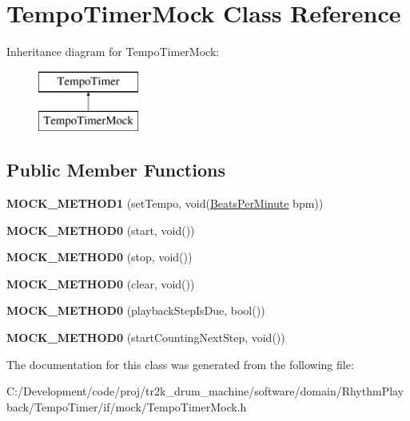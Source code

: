 \hypertarget{class_tempo_timer_mock}{}\section{Tempo\+Timer\+Mock Class Reference}
\label{class_tempo_timer_mock}
Inheritance diagram for Tempo\+Timer\+Mock\+:\begin{figure}[H]
\begin{center}
\leavevmode
\includegraphics[height=2.000000cm]{class_tempo_timer_mock}
\end{center}
\end{figure}
\subsection*{Public Member Functions}
\begin{DoxyCompactItemize}
\item 
\mbox{\label{class_tempo_timer_mock_a744b62ff6f202c876325f757f9ccc836}} 
{\bfseries M\+O\+C\+K\+\_\+\+M\+E\+T\+H\+O\+D1} (set\+Tempo, void(\mbox{\hyperlink{class_beats_per_minute}{Beats\+Per\+Minute}} bpm))
\item 
\mbox{\label{class_tempo_timer_mock_a77a9c50cf356c36511139c8270625793}} 
{\bfseries M\+O\+C\+K\+\_\+\+M\+E\+T\+H\+O\+D0} (start, void())
\item 
\mbox{\label{class_tempo_timer_mock_a79ac2d1e81fe29d3301b8c38c93879d1}} 
{\bfseries M\+O\+C\+K\+\_\+\+M\+E\+T\+H\+O\+D0} (stop, void())
\item 
\mbox{\label{class_tempo_timer_mock_a2a9634cefd6bafe16cd7f09621a57fe9}} 
{\bfseries M\+O\+C\+K\+\_\+\+M\+E\+T\+H\+O\+D0} (clear, void())
\item 
\mbox{\label{class_tempo_timer_mock_ac38619037ba0cdc4659286cb512ff08a}} 
{\bfseries M\+O\+C\+K\+\_\+\+M\+E\+T\+H\+O\+D0} (playback\+Step\+Is\+Due, bool())
\item 
\mbox{\label{class_tempo_timer_mock_a2db4e5a24a1e9e2c253d9efcc8a3f6c5}} 
{\bfseries M\+O\+C\+K\+\_\+\+M\+E\+T\+H\+O\+D0} (start\+Counting\+Next\+Step, void())
\end{DoxyCompactItemize}


The documentation for this class was generated from the following file\+:\begin{DoxyCompactItemize}
\item 
C\+:/\+Development/code/proj/tr2k\+\_\+drum\+\_\+machine/software/domain/\+Rhythm\+Playback/\+Tempo\+Timer/if/mock/Tempo\+Timer\+Mock.\+h\end{DoxyCompactItemize}
